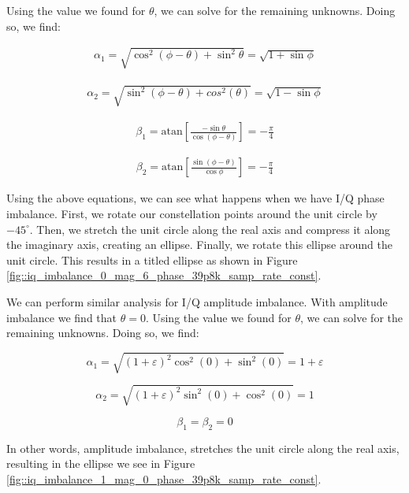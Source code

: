 \documentclass{article}
\begin{document}
Using the value we found for $\theta$, we can solve for the remaining unknowns. Doing so, we find:

\begin{align}
	\alpha_1 = \sqrt{\cos^2(\phi-\theta)+\sin^2\theta} = \sqrt{1+\sin\phi}
\end{align}

\begin{align}
	\alpha_2 = \sqrt{\sin^2(\phi-\theta)+cos^2(\theta)} = \sqrt{1-\sin\phi}
\end{align}

\begin{align}
	\beta_1 = \text{atan}\left[\frac{-\sin\theta}{\cos(\phi-\theta)}\right] = -\frac{\pi}{4}
\end{align}

\begin{align}
	\beta_2 = \text{atan}\left[\frac{\sin(\phi-\theta)}{\cos\phi}\right] = -\frac{\pi}{4}
\end{align}

Using the above equations, we can see what happens when we have I/Q phase imbalance. First, we rotate our constellation points around the unit circle by $-45^{\circ}$. Then, we stretch the unit circle along the real axis and compress it along the imaginary axis, creating an ellipse. Finally, we rotate this ellipse around the unit circle. This results in a titled ellipse as shown in Figure \ref{fig::iq_imbalance_0_mag_6_phase_39p8k_samp_rate_const}.

We can perform similar analysis for I/Q amplitude imbalance. With amplitude imbalance we find that $\theta = 0$. Using the value we found for $\theta$, we can solve for the remaining unknowns. Doing so, we find:

\begin{equation}
	\alpha_1 = \sqrt{(1+\varepsilon)^2\cos^2(0)+\sin^2(0)} = 1 + \varepsilon
\end{equation}

\begin{equation}
	\alpha_2 = \sqrt{(1+\varepsilon)^2\sin^2(0)+\cos^2(0)} = 1
\end{equation}

\begin{equation}
	\beta_1 = \beta_2 = 0
\end{equation}

In other words, amplitude imbalance, stretches the unit circle along the real axis, resulting in the ellipse we see in Figure \ref{fig::iq_imbalance_1_mag_0_phase_39p8k_samp_rate_const}.
\end{document}
